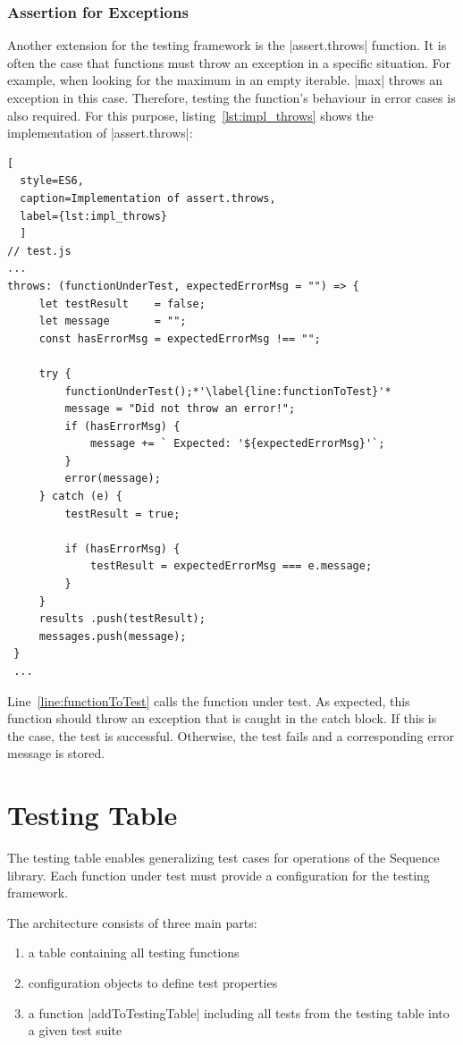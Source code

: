 \subsubsection{Assertion for Exceptions}
\label{subsub:Assertion for Exceptions}
Another extension for the testing framework is the |assert.throws| function. It
is often the case that functions must throw an exception in a specific
situation. For example, when looking for the maximum in an empty iterable.
|max| throws an exception in this case. Therefore, testing the function's
behaviour in error cases is also required. For this purpose,
listing~\ref{lst:impl_throws} shows the implementation of |assert.throws|:

\begin{lstlisting}[
  style=ES6, 
  caption=Implementation of assert.throws,
  label={lst:impl_throws}
  ]
// test.js
...
throws: (functionUnderTest, expectedErrorMsg = "") => {
     let testResult    = false;
     let message       = "";
     const hasErrorMsg = expectedErrorMsg !== "";

     try {
         functionUnderTest();*'\label{line:functionToTest}'*
         message = "Did not throw an error!";
         if (hasErrorMsg) {
             message += ` Expected: '${expectedErrorMsg}'`;
         }
         error(message);
     } catch (e) {
         testResult = true;

         if (hasErrorMsg) {
             testResult = expectedErrorMsg === e.message;
         }
     }
     results .push(testResult);
     messages.push(message);
 }
 ...
\end{lstlisting}


Line~\ref{line:functionToTest} calls the function under test. As expected, this
function should throw an exception that is caught in the catch block. If this
is the case, the test is successful. Otherwise, the test fails and a
corresponding error message is stored.

\section{Testing Table}
\label{sec:Testing Table}
The testing table enables generalizing test cases for operations of the
Sequence library. Each function under test must provide a configuration for the
testing framework.

The architecture consists of three main parts:
\begin{enumerate}
  \item{a table containing all testing functions}
  \item{configuration objects to define test properties}
  \item{a function |addToTestingTable| including all tests from the testing
    table into a given test suite}
\end{enumerate}

